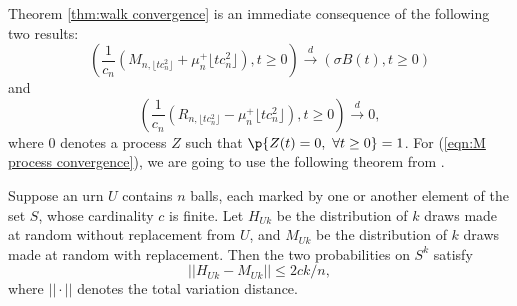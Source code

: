 Theorem \ref{thm:walk convergence} is an immediate consequence of the following two results: 
\begin{equation}\label{eqn:M process convergence}
\left(\frac{1}{c_n}(M_{n, \lfloor tc^2_n \rfloor}+\mu^+_n\lfloor tc^2_n \rfloor), t\ge 0 \right)\overset{d}{\to}\left(\sigma B(t), t\ge 0\right)
\end{equation}
and
\begin{equation}\label{eqn:R process convergence}
\left(\frac{1}{c_n}(R_{n, \lfloor tc^2_n \rfloor}-\mu^+_n\lfloor tc^2_n \rfloor), t\ge 0 \right)\overset{d}{\to} 0,
\end{equation}
where $0$ denotes a process $Z$ such that $\p{Z(t)=0,~ \forall t\ge 0}=1$.
For (\ref{eqn:M process convergence}), we are going to use the following theorem from \cite{DiFr1980}.
\begin{thm}\label{thm:finite exchangeable sequences}
Suppose an urn $U$ contains $n$ balls, each marked by one or another element of the set $S$, whose cardinality $c$ is finite. Let $H_{Uk}$ be the distribution of $k$ draws made at random without replacement from $U$, and $M_{Uk}$ be the distribution of $k$ draws made at random with replacement. Then the two probabilities on $S^k$ satisfy
\[||H_{Uk}-M_{Uk}||\le 2ck/n,\]
where $||\cdot||$ denotes the total variation distance.
\end{thm}
